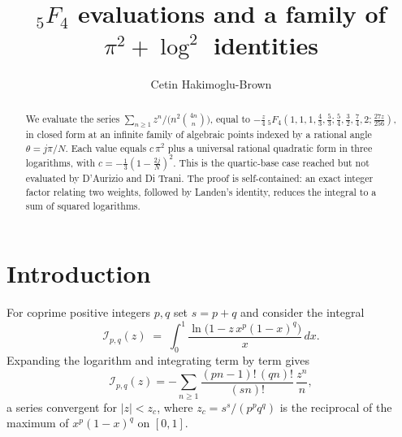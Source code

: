 \documentclass[11pt]{article}
\title{${}_5F_4$ evaluations and a family of $\pi^2+\log^2$ identities}
\author{Cetin Hakimoglu-Brown}
\date{}
\theoremstyle{definition}
\begin{document}
\maketitle

\begin{abstract}
We evaluate the series $\sum_{n\ge1} z^n\big/\!\big(n^2\binom{4n}{n}\big)$, equal to
$-\tfrac{z}{4}\,{}_5F_4\!\left(1,1,1,\tfrac43,\tfrac53;\tfrac54,\tfrac32,\tfrac74,2;\tfrac{27z}{256}\right)$,
in closed form at an infinite family of algebraic points indexed by a rational angle
$\theta=j\pi/N$. Each value equals $c\,\pi^2$ plus a universal rational quadratic form in three
logarithms, with $c=-\tfrac13\left(1-\tfrac{2j}{N}\right)^2$. This is the quartic-base case reached
but not evaluated by D'Aurizio and Di Trani. The proof is self-contained: an exact integer factor
relating two weights, followed by Landen's identity, reduces the integral to a sum of squared
logarithms. \end{abstract}

\section{Introduction}

For coprime positive integers $p,q$ set $s=p+q$ and consider the integral
\begin{equation}\label{eq:base-integral}
  \mathcal{I}_{p,q}(z)\;=\;\int_0^1 \frac{\ln\!\big(1-z\,x^p(1-x)^q\big)}{x}\,dx .
\end{equation}
Expanding the logarithm and integrating term by term gives
\begin{equation}\label{eq:series}
  \mathcal{I}_{p,q}(z)
  = -\sum_{n\ge1}\frac{(pn-1)!\,(qn)!}{(sn)!}\,\frac{z^n}{n},
\end{equation}
a series convergent for $|z|<z_c$, where $z_c=s^s/(p^pq^q)$ is the reciprocal of the maximum of
$x^p(1-x)^q$ on $[0,1]$.
\end{document}
